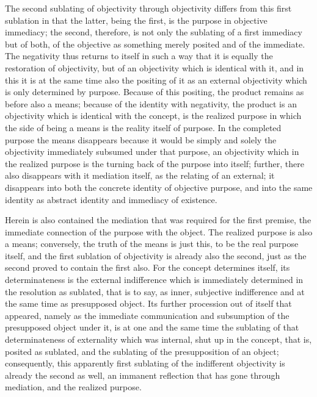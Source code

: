 The second sublating of objectivity through objectivity
differs from this first sublation in that the latter,
being the first, is the purpose in objective immediacy;
the second, therefore, is not only the sublating of
a first immediacy but of both,
of the objective as something merely posited
and of the immediate.
The negativity thus returns to itself in such a way
that it is equally the restoration of objectivity,
but of an objectivity which is identical with it,
and in this it is at the same time also the positing of it
as an external objectivity which is only determined by purpose.
Because of this positing,
the product remains as before also a means;
because of the identity with negativity,
the product is an objectivity
which is identical with the concept,
is the realized purpose
in which the side of being a means
is the reality itself of purpose.
In the completed purpose the means disappears
because it would be simply and solely
the objectivity immediately subsumed under that purpose,
an objectivity which in the realized purpose is
the turning back of the purpose into itself;
further, there also disappears with it mediation itself,
as the relating of an external;
it disappears into both
the concrete identity of objective purpose,
and into the same identity as
abstract identity and immediacy of existence.

Herein is also contained the mediation
that was required for the first premise,
the immediate connection of the purpose with the object.
The realized purpose is also a means;
conversely, the truth of the means is just this,
to be the real purpose itself,
and the first sublation of objectivity
is already also the second,
just as the second proved to contain the first also.
For the concept determines itself,
its determinateness is the external indifference
which is immediately determined in the resolution as sublated,
that is to say, as inner, subjective indifference
and at the same time as presupposed object.
Its further procession out of itself that appeared,
namely as the immediate communication and subsumption of
the presupposed object under it,
is at one and the same time
the sublating of that determinateness of externality
which was internal, shut up in the concept,
that is, posited as sublated,
and the sublating of the presupposition of an object;
consequently, this apparently first sublating of
the indifferent objectivity is already the second as well,
an immanent reflection that has gone through mediation,
and the realized purpose.

